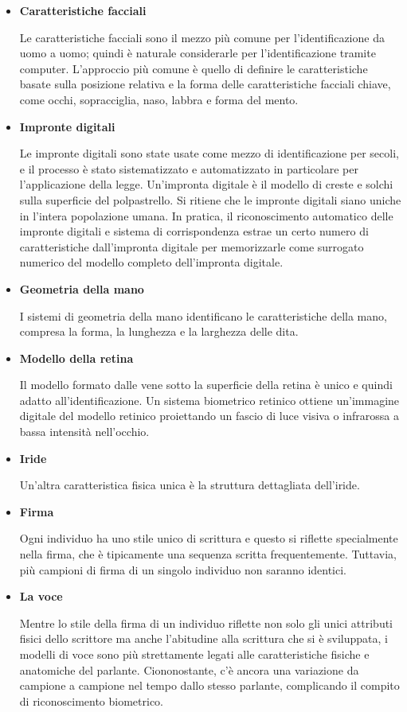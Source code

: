 \begin{itemize}
    \item \textbf{Caratteristiche facciali}
    
    Le caratteristiche facciali sono il mezzo più comune per l'identificazione da uomo a uomo; quindi è naturale considerarle per l'identificazione tramite computer. L'approccio più comune è quello di definire le caratteristiche basate sulla posizione relativa e la forma delle caratteristiche facciali chiave, come occhi, sopracciglia, naso, labbra e forma del mento.
    
    \item \textbf{Impronte digitali}
    
    Le impronte digitali sono state usate come mezzo di identificazione per secoli, e il processo è stato sistematizzato e automatizzato in particolare per l'applicazione della legge. Un'impronta digitale è il modello di creste e solchi sulla superficie del polpastrello. Si ritiene che le impronte digitali siano uniche in l'intera popolazione umana. In pratica, il riconoscimento automatico delle impronte digitali e sistema di corrispondenza estrae un certo numero di caratteristiche dall'impronta digitale per memorizzarle come surrogato numerico del modello completo dell'impronta digitale.
    
    \item \textbf{Geometria della mano}

    I sistemi di geometria della mano identificano le caratteristiche della mano, compresa la forma, la lunghezza e la larghezza delle dita.
    
    \item \textbf{Modello della retina}
    
    Il modello formato dalle vene sotto la superficie della retina è unico e quindi adatto all'identificazione. Un sistema biometrico retinico ottiene un'immagine digitale del modello retinico proiettando un fascio di luce visiva o infrarossa a bassa intensità nell'occhio.
    
    \item \textbf{Iride}
    
    Un'altra caratteristica fisica unica è la struttura dettagliata dell'iride.
    
    \item \textbf{Firma}
    
    Ogni individuo ha uno stile unico di scrittura e questo si riflette specialmente nella firma, che è tipicamente una sequenza scritta frequentemente. Tuttavia, più campioni di firma di un singolo individuo non saranno identici.
    
    \item \textbf{La voce}
    
    Mentre lo stile della firma di un individuo riflette non solo gli unici attributi fisici dello scrittore ma anche l'abitudine alla scrittura che si è sviluppata, i modelli di voce sono più strettamente legati alle caratteristiche fisiche e anatomiche del parlante. Ciononostante, c'è ancora una variazione da campione a campione nel tempo dallo stesso parlante, complicando il compito di riconoscimento biometrico.
\end{itemize}
\newpage
